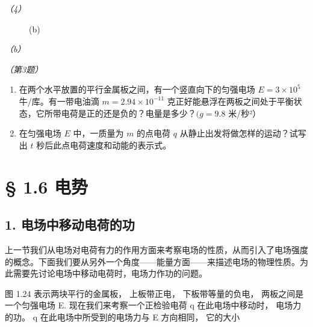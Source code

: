 \emph{（4）}

\begin{figure}
\centering
{}
\caption{(b)}
\end{figure}

\emph{（b）}

\emph{（第3题）}

\begin{enumerate}
\def\labelenumi{\arabic{enumi}.}
\setcounter{enumi}{3}
\item
  在两个水平放置的平行金属板之间，有一个竖直向下的匀强电场
  \(E = 3 \times 10^{5}\) 牛/库。有一带电油滴
  \(m = 2.94 \times 10^{-11}\)
  克正好能悬浮在两板之间处于平衡状态，它所带电荷是正的还是负的？电量是多少？\((g = 9.8\)
  米/秒²）
\item
  在匀强电场 \(E\) 中，一质量为 \(m\) 的点电荷 \(q\)
  从静止出发将做怎样的运动？试写出 \(t\)
  秒后此点电荷速度和动能的表示式。
\end{enumerate}

\section{§ 1.6 电势}\label{ux7535ux52bf}

\subsection{1.
电场中移动电荷的功}\label{ux7535ux573aux4e2dux79fbux52a8ux7535ux8377ux7684ux529f}

上一节我们从电场对电荷有力的作用方面来考察电场的性质，从而引入了电场强度的概念。下面我们要从另外一个角度------能量方面------来描述电场的物理性质。为此需要先讨论电场中移动电荷时，电场力作功的问题。

图 1.24 表示两块平行的金属板， 上板带正电， 下板带等量的负电，
两板之间是一个匀强电场 E. 现在我们来考察一个正检验电荷 q
在此电场中移动时， 电场力的功。 q 在此电场中所受到的电场力与 E
方向相同， 它的大小


